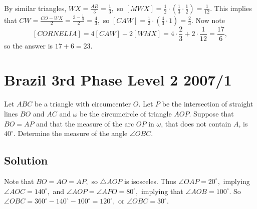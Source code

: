 \documentclass[mast]{lucky}
\begin{document}
By similar triangles, $WX=\frac{AR}{3}=\frac{1}{3},$ so $[MWX]=\frac{1}{2}\cdot (\frac{1}{3}\cdot \frac{1}{2})=\frac{1}{12}.$ This implies that $CW=\frac{CO-WX}{2}=\frac{3-\frac{1}{3}}{2}=\frac{4}{3},$ so $[CAW]=\frac{1}{2}\cdot (\frac{4}{3}\cdot 1)=\frac{2}{3}.$ Now note
\[[CORNELIA]=4[CAW]+2[WMX]=4\cdot \frac{2}{3}+2\cdot\frac{1}{12}=\frac{17}{6},\]
so the answer is $17+6=23.$

\begin{center}
\end{center}

\pagebreak\section{Brazil 3rd Phase Level 2 2007/1}

Let $ABC$ be a triangle with circumcenter $O$. Let $P$ be the intersection of straight lines $BO$ and $AC$ and $\omega$ be the circumcircle of triangle $AOP$. Suppose that $BO = AP$ and that the measure of the arc $OP$ in $\omega$, that does not contain $A$, is $40^{\circ}$. Determine the measure of the angle $\angle OBC$.

\subsection{Solution}

Note that $BO=AO=AP,$ so $\triangle AOP$ is isosceles. Thus $\angle OAP=20^{\circ},$ implying $\angle AOC=140^{\circ},$ and $\angle AOP=\angle APO=80^{\circ},$ implying that $\angle AOB=100^{\circ}.$ So $\angle OBC=360^{\circ}-140^{\circ}-100^{\circ}=120^{\circ},$ or $\angle OBC=30^{\circ}.$
    
\end{document}

